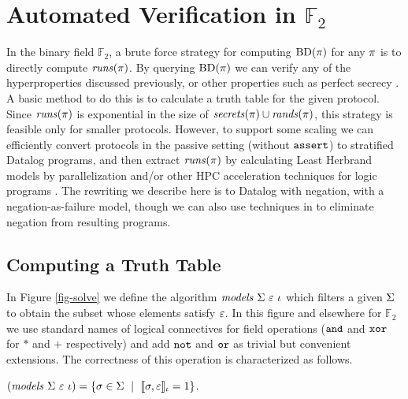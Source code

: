 \section{Automated Verification in $\mathbb{F}_2$}
\label{section-bruteforce}

In the binary field $\mathbb{F}_2$, a brute force strategy for computing
$\mathrm{BD}(\pi)$ for any $\pi$ is to directly compute
$\mathit{runs}(\pi)$. By querying $\mathrm{BD}(\pi)$ we can verify any of the
hyperproperties discussed previously, or other properties such as
perfect secrecy \cite{XXX}.  A basic method to do this is
to calculate a truth table for the given protocol. Since
$\mathit{runs}(\pi)$ is exponential in
the size of $\mathit{secrets}(\pi) \cup \mathit{rands}(\pi)$, this strategy is
feasible only for smaller protocols. However, to support some
scaling we can efficiently
convert protocols in the passive setting (without $\texttt{assert}$) to
stratified Datalog programs, and then extract $\mathit{runs}(\pi)$ by
calculating Least Herbrand models by parallelization and/or other HPC
acceleration techniques for logic programs \cite{aspis2018linear}.
The rewriting we describe here is to Datalog with negation, with a
negation-as-failure model, though we can also use techniques in
\cite{sakama2017linear} to eliminate negation from resulting programs.

\subsection{Computing a Truth Table}

In Figure \ref{fig-solve} we define the algorithm
$\mathit{models}\ \Sigma\ \varepsilon\ \iota$ which filters a given $\Sigma$ to obtain the
subset whose elements satisfy $\varepsilon$. In this figure and elsewhere for
$\mathbb{F}_2$ we use standard names of logical connectives
for field operations ($\texttt{and}$ and $\texttt{xor}$ for $*$ and $+$ respectively) and
add $\texttt{not}$ and $\texttt{or}$ as trivial but convenient extensions. The correctness
of this operation is characterized as follows.
\begin{lemma}
  \label{lemma-solves}
  $(\mathit{models}\ \Sigma\ \varepsilon\ \iota) = \{ \sigma \in \Sigma \ \mid\ \llbracket \sigma,\varepsilon \rrbracket_{\iota} = 1 \}$.
\end{lemma}

\solvefig

